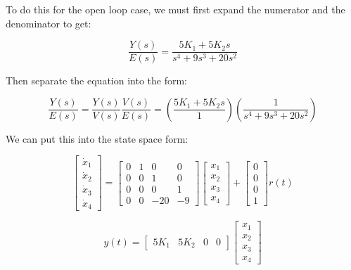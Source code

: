 \documentclass[12pt, letterpaper]{../assignment}
\begin{document}
To do this for the open loop case, we must first expand the numerator and the denominator to get:

$$ \frac{Y(s)}{E(s)} = \frac{5K_1 + 5K_2 s}{s^4 + 9 s^3 + 20 s^2} $$

Then separate the equation into the form:

$$ \frac{Y(s)}{E(s)} = \frac{Y(s)}{V(s)} \frac{V(s)}{E(s)} = \left(\frac{5K_1 + 5K_2 s}{1}\right) \left(\frac{1}{s^4 + 9 s^3 + 20 s^2}\right) $$

We can put this into the state space form:

\begin{answer}
    \begin{equation*}
        \begin{bmatrix}
            \dot{x}_1\\ \dot{x}_2\\ \dot{x}_3\\ \dot{x}_4
        \end{bmatrix}=
        \begin{bmatrix}
            0 & 1 & 0 & 0 \\
            0 & 0 & 1 & 0 \\
            0 & 0 & 0 & 1 \\
            0 & 0 & -20 & -9
        \end{bmatrix}
        \begin{bmatrix}
            x_1\\ x_2\\ x_3\\ x_4
        \end{bmatrix}
        + \begin{bmatrix}
            0\\ 0\\ 0\\ 1
        \end{bmatrix} r(t)
    \end{equation*}
\end{answer}
\begin{answer}
    \begin{equation*}
        y(t)=
        \begin{bmatrix}
            5 K_1 & 5 K_2 & 0 & 0
        \end{bmatrix}
        \begin{bmatrix}
            x_1\\ x_2\\ x_3\\ x_4
        \end{bmatrix}
    \end{equation*}
\end{answer}
\end{document}
